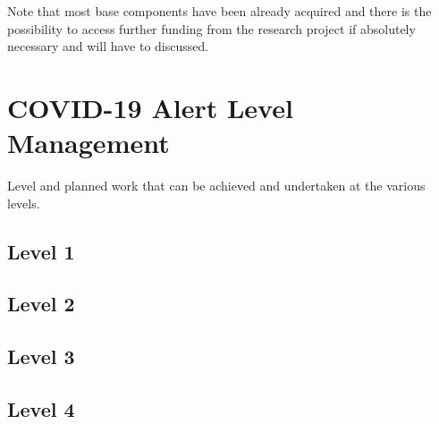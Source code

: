 \documentclass[11pt, a4paper, twoside, openright]{report}
\begin{document}
Note that most base components have been already acquired and there is the possibility to access further funding from the research project if absolutely necessary and will have to discussed.  

\section{COVID-19 Alert Level Management}
Level and planned work that can be achieved and undertaken at the various levels.
\subsection{Level 1}
\subsection{Level 2}
\subsection{Level 3}
\subsection{Level 4}


\backmatter

\nocite{*}


\end{document}
